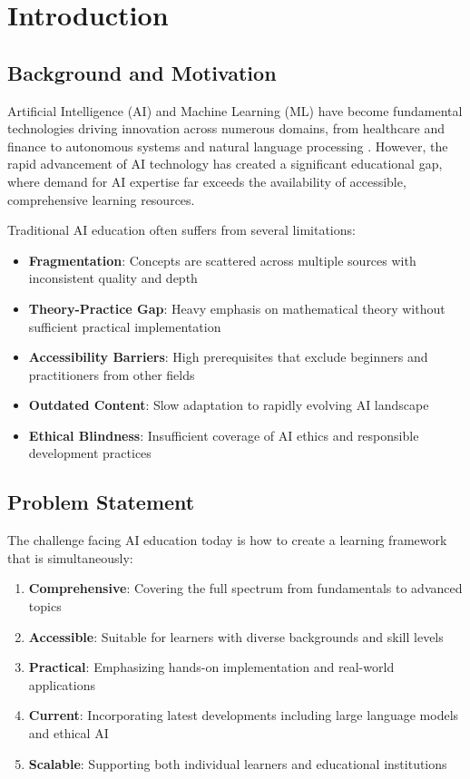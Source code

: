 \section{Introduction}
\label{sec:introduction}

\subsection{Background and Motivation}

Artificial Intelligence (AI) and Machine Learning (ML) have become fundamental technologies driving innovation across numerous domains, from healthcare and finance to autonomous systems and natural language processing \cite{russell2016artificial}. However, the rapid advancement of AI technology has created a significant educational gap, where demand for AI expertise far exceeds the availability of accessible, comprehensive learning resources.

Traditional AI education often suffers from several limitations:
\begin{itemize}
    \item \textbf{Fragmentation}: Concepts are scattered across multiple sources with inconsistent quality and depth
    \item \textbf{Theory-Practice Gap}: Heavy emphasis on mathematical theory without sufficient practical implementation
    \item \textbf{Accessibility Barriers}: High prerequisites that exclude beginners and practitioners from other fields
    \item \textbf{Outdated Content}: Slow adaptation to rapidly evolving AI landscape
    \item \textbf{Ethical Blindness}: Insufficient coverage of AI ethics and responsible development practices
\end{itemize}

\subsection{Problem Statement}

The challenge facing AI education today is how to create a learning framework that is simultaneously:
\begin{enumerate}
    \item \textbf{Comprehensive}: Covering the full spectrum from fundamentals to advanced topics
    \item \textbf{Accessible}: Suitable for learners with diverse backgrounds and skill levels
    \item \textbf{Practical}: Emphasizing hands-on implementation and real-world applications
    \item \textbf{Current}: Incorporating latest developments including large language models and ethical AI
    \item \textbf{Scalable}: Supporting both individual learners and educational institutions
\end{enumerate}

